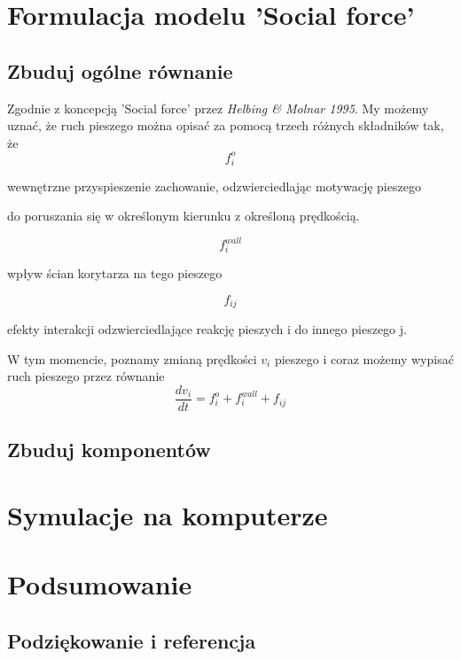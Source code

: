 \documentclass[12pt, a4paper]{report}
\begin{document}
\clearpage 

\tableofcontents

\setlength{\baselineskip}{18pt}
\clearpage 

\clearpage 

\chapter{Formulacja modelu 'Social force'}
\section{Zbuduj ogólne równanie}
\hspace{4ex}Zgodnie z koncepcją 'Social force' przez {\it Helbing \& Molnar 1995}. My możemy uznać, że ruch pieszego można opisać za pomocą trzech różnych składników tak, że 
$$f_{i}^{o}$$  \centerline{wewnętrzne przyspieszenie zachowanie, odzwierciedlając motywację pieszego} \centerline{do poruszania się w określonym kierunku z określoną prędkością.} 
$$f_{i}^{wall}$$ \centerline{wpływ ścian korytarza na tego pieszego}
$$f_{ij}$$ \centerline{efekty interakcji odzwierciedlające reakcję pieszych i do innego pieszego j.}
\par \medskip W tym momencie, poznamy zmianą prędkości $v_{i}$ pieszego i coraz możemy wypisać ruch pieszego przez równanie
$$
\frac{dv_{i}}{dt} = f_{i}^{o} + f_{i}^{wall} + f_{ij}
$$
\section{Zbuduj komponentów}


\chapter{Symulacje na komputerze}

\chapter{Podsumowanie}

\section*{Podziękowanie i referencja}
\end{document}
